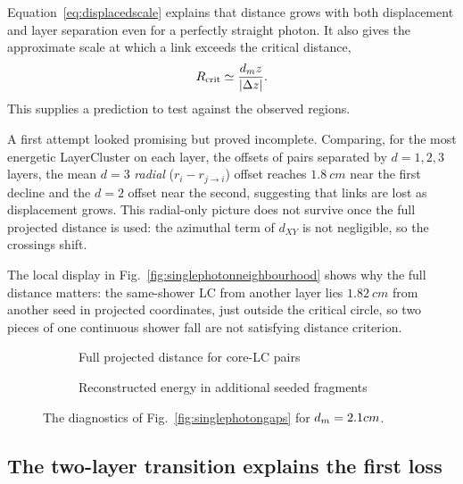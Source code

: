 Equation~\eqref{eq:displacedscale} explains that distance grows with both
displacement and layer separation even for a perfectly straight photon.
It also gives the approximate scale at which a link exceeds the critical
distance,
\begin{equation}
  R_{\mathrm{crit}}\simeq\frac{d_{m} z}{|\Delta z|}.
  \label{eq:criticaldisplacement}
\end{equation}
This supplies a prediction to test against the observed regions.

A first attempt looked promising but proved incomplete. Comparing, for the
most energetic LayerCluster on each layer, the offsets of pairs separated
by $d=1,2,3$ layers, the mean $d=3$ \emph{radial} ($r_i - r_{j \to i}$) offset reaches
$\SI{1.8}{cm}$ near the first decline and the $d=2$ offset near the
second, suggesting that links are lost as displacement
grows. This radial-only picture does not survive once the full projected
distance is used: the azimuthal term of $d_{XY}$ is not negligible, so the
crossings shift.



The local display in Fig.~\ref{fig:singlephotonneighbourhood} shows why the
full distance matters: the same-shower LC from another layer lies
$\SI{1.82}{cm}$ from another seed in projected coordinates, just
outside the critical circle, so two pieces of one continuous shower fall are not satisfying distance criterion.

\begin{figure}[!tp]
  \centering
  \begin{subfigure}[t]{0.49\textwidth}
    \caption{Full projected distance for core-LC pairs}
  \end{subfigure}\hfill
  \begin{subfigure}[t]{0.49\textwidth}
    \caption{Reconstructed energy in additional seeded fragments}
  \end{subfigure}
  \caption{The diagnostics of Fig.~\ref{fig:singlephotongaps} for
  $d_{m}=2.1 cm$.}
  \label{fig:singlephoton-ablation}
\end{figure}

\subsection{The two-layer transition explains the first loss}



